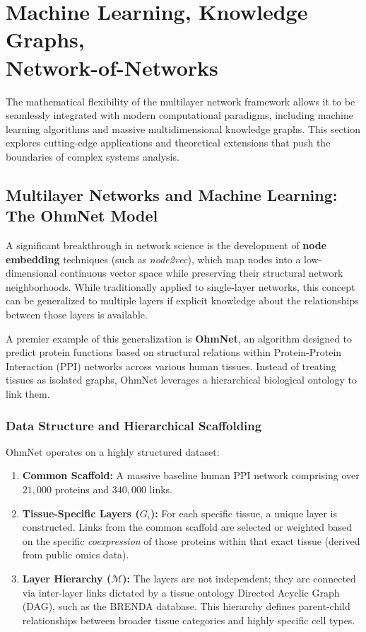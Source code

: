 \section[Machine Learning, Knowledge Graphs, Network-of-Networks]{Machine Learning, Knowledge Graphs,\\Network-of-Networks}
\label{sec:multilayer_advanced_applications}

The mathematical flexibility of the multilayer network framework allows it to be seamlessly integrated with modern computational paradigms, including machine learning algorithms and massive multidimensional knowledge graphs. This section explores cutting-edge applications and theoretical extensions that push the boundaries of complex systems analysis.

\subsection{Multilayer Networks and Machine Learning: The OhmNet Model}
\label{subsec:ohmnet_machine_learning}

A significant breakthrough in network science is the development of \textbf{node embedding} techniques (such as \textit{node2vec}), which map nodes into a low-dimensional continuous vector space while preserving their structural network neighborhoods. While traditionally applied to single-layer networks, this concept can be generalized to multiple layers if explicit knowledge about the relationships between those layers is available.

A premier example of this generalization is \textbf{OhmNet}, an algorithm designed to predict protein functions based on structural relations within Protein-Protein Interaction (PPI) networks across various human tissues. Instead of treating tissues as isolated graphs, OhmNet leverages a hierarchical biological ontology to link them.

\subsubsection{Data Structure and Hierarchical Scaffolding}
\label{subsubsec:ohmnet_data_structure}

OhmNet operates on a highly structured dataset:
\begin{enumerate}
    \item \textbf{Common Scaffold:} A massive baseline human PPI network comprising over $21,000$ proteins and $340,000$ links.
    \item \textbf{Tissue-Specific Layers ($G_i$):} For each specific tissue, a unique layer is constructed. Links from the common scaffold are selected or weighted based on the specific \textit{coexpression} of those proteins within that exact tissue (derived from public omics data).
    \item \textbf{Layer Hierarchy ($\mathcal{M}$):} The layers are not independent; they are connected via inter-layer links dictated by a tissue ontology Directed Acyclic Graph (DAG), such as the BRENDA database. This hierarchy defines parent-child relationships between broader tissue categories and highly specific cell types.
\end{enumerate}

